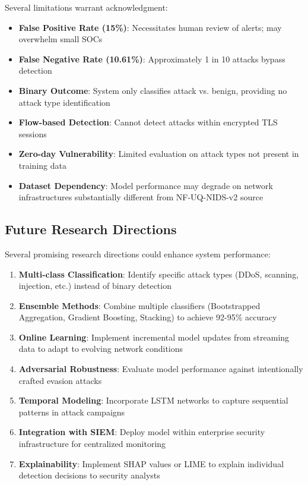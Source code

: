 \documentclass[conference]{IEEEtran}
\begin{document}
Several limitations warrant acknowledgment:

\begin{itemize}
    \item \textbf{False Positive Rate (15\%)}: Necessitates human review of alerts; may overwhelm small SOCs
    \item \textbf{False Negative Rate (10.61\%)}: Approximately 1 in 10 attacks bypass detection
    \item \textbf{Binary Outcome}: System only classifies attack vs. benign, providing no attack type identification
    \item \textbf{Flow-based Detection}: Cannot detect attacks within encrypted TLS sessions
    \item \textbf{Zero-day Vulnerability}: Limited evaluation on attack types not present in training data
    \item \textbf{Dataset Dependency}: Model performance may degrade on network infrastructures substantially different from NF-UQ-NIDS-v2 source
\end{itemize}

\subsection{Future Research Directions}

Several promising research directions could enhance system performance:

\begin{enumerate}
    \item \textbf{Multi-class Classification}: Identify specific attack types (DDoS, scanning, injection, etc.) instead of binary detection
    \item \textbf{Ensemble Methods}: Combine multiple classifiers (Bootstrapped Aggregation, Gradient Boosting, Stacking) to achieve 92-95\% accuracy
    \item \textbf{Online Learning}: Implement incremental model updates from streaming data to adapt to evolving network conditions
    \item \textbf{Adversarial Robustness}: Evaluate model performance against intentionally crafted evasion attacks
    \item \textbf{Temporal Modeling}: Incorporate LSTM networks to capture sequential patterns in attack campaigns
    \item \textbf{Integration with SIEM}: Deploy model within enterprise security infrastructure for centralized monitoring
    \item \textbf{Explainability}: Implement SHAP values or LIME to explain individual detection decisions to security analysts
\end{enumerate}
\end{document}
